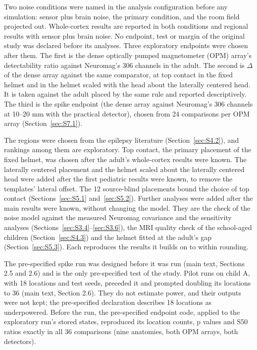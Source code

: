 \documentclass[preprint,12pt,authoryear,a4paper]{elsarticle}
\begin{document}
Two noise conditions were named in the analysis configuration before any simulation: sensor plus brain noise, the primary condition, and the room field projected out. Whole-cortex results are reported in both conditions and regional results with sensor plus brain noise. No endpoint, test or margin of the original study was declared before its analyses. Three exploratory endpoints were chosen after them. The first is the dense optically pumped magnetometer (OPM) array's detectability ratio against Neuromag's 306 channels in the adult. The second is $\Delta$ of the dense array against the same comparator, at top contact in the fixed helmet and in the helmet scaled with the head about the laterally centered head. It is taken against the adult placed by the same rule and reported descriptively. The third is the spike endpoint (the dense array against Neuromag's 306 channels at 10–20 mm with the practical detector), chosen from 24 comparisons per OPM array (Section~\ref{sec:S7.1}).

The regions were chosen from the epilepsy literature (Section~\ref{sec:S4.2}), and rankings among them are exploratory. Top contact, the primary placement of the fixed helmet, was chosen after the adult's whole-cortex results were known. The laterally centered placement and the helmet scaled about the laterally centered head were added after the first pediatric results were known, to remove the templates' lateral offset. The 12 source-blind placements bound the choice of top contact (Sections~\ref{sec:S5.1} and~\ref{sec:S5.2}). Further analyses were added after the main results were known, without changing the model. They are the check of the noise model against the measured Neuromag covariance and the sensitivity analyses (Sections~\ref{sec:S3.4}--\ref{sec:S3.6}), the MRI quality check of the school-aged children (Section~\ref{sec:S4.3}) and the helmet fitted at the adult's gap (Section~\ref{sec:S5.3}). Each reproduces the results it builds on to within rounding.

The pre-specified spike run was designed before it was run (main text, Sections 2.5 and 2.6) and is the only pre-specified test of the study. Pilot runs on child A, with 18 locations and test seeds, preceded it and prompted doubling its locations to 36 (main text, Section 2.6). They do not estimate power, and their outputs were not kept; the pre-specified declaration describes 18 locations as underpowered. Before the run, the pre-specified endpoint code, applied to the exploratory run's stored states, reproduced its location counts, p values and S50 ratios exactly in all 36 comparisons (nine anatomies, both OPM arrays, both detectors).
\end{document}
